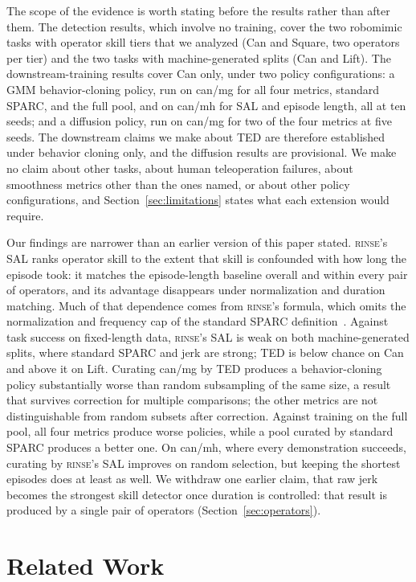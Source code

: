 \documentclass[10pt]{article}
\newcommand{\rinse}{\textmd{\textsc{rinse}}}
\begin{document}
The scope of the evidence is worth stating before the results rather than
after them. The detection results, which involve no training, cover the two
robomimic tasks with operator skill tiers that we analyzed (Can and Square,
two operators per tier) and the two tasks with machine-generated splits (Can
and Lift). The downstream-training results cover Can only, under two policy
configurations: a GMM behavior-cloning policy, run on can/mg for all four
metrics, standard SPARC, and the full pool, and on can/mh for SAL and
episode length, all at ten seeds; and a diffusion policy, run on can/mg for
two of the four metrics at five seeds. The downstream claims we make about TED are therefore established
under behavior cloning only, and the diffusion results are provisional. We
make no claim about other tasks, about human teleoperation failures, about
smoothness metrics other than the ones named, or about other policy
configurations, and Section~\ref{sec:limitations} states what each
extension would require.

Our findings are narrower than an earlier version of this paper stated.
\rinse{}'s SAL ranks operator skill to the extent that skill is confounded
with how long the episode took: it matches the episode-length baseline
overall and within every pair of operators, and its advantage disappears
under normalization and duration matching. Much of that dependence comes
from \rinse{}'s formula, which omits the normalization and frequency cap of
the standard SPARC definition~\citep{sparc}. Against task success on
fixed-length data, \rinse{}'s SAL is weak on both machine-generated splits,
where standard SPARC and jerk are strong; TED is below chance on Can and
above it on Lift. Curating can/mg by TED produces a behavior-cloning policy
substantially worse than random subsampling of the same size, a result that
survives correction for multiple comparisons; the other metrics are not
distinguishable from random subsets after correction. Against training on
the full pool, all four metrics produce worse policies, while a pool
curated by standard SPARC produces a better one. On can/mh, where every
demonstration succeeds, curating by \rinse{}'s SAL improves on random
selection, but keeping the shortest episodes does at least as well. We withdraw one earlier claim, that
raw jerk becomes the strongest skill detector once duration is controlled:
that result is produced by a single pair of operators
(Section~\ref{sec:operators}).

\section{Related Work}
\end{document}
